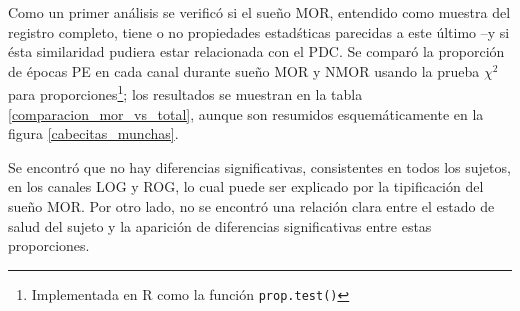 \documentclass[12pt,a4paper]{mitthesis}
\begin{document}
Como un primer an\'alisis se verific\'o si el sue\~no MOR, entendido como muestra del registro
completo, tiene o no propiedades estad\'sticas parecidas a este \'ultimo --y si \'esta similaridad 
pudiera estar relacionada con el PDC. 
Se compar\'o la proporci\'on de \'epocas PE en cada canal durante sue\~no MOR y NMOR usando la 
prueba $\chi^{2}$ para proporciones\footnote{Implementada en R como la funci\'on 
\texttt{prop.test()}}; los resultados se muestran en la tabla \ref{comparacion_mor_vs_total},
aunque son resumidos esquem\'aticamente en la figura \ref{cabecitas_munchas}.

Se encontr\'o que no hay diferencias significativas, consistentes en todos los sujetos, en los 
canales LOG y ROG, lo cual puede ser explicado por la tipificaci\'on del sue\~no MOR. 
Por otro lado, no se encontr\'o una relaci\'on clara entre el estado de salud del sujeto y la 
aparici\'on de diferencias significativas entre estas proporciones.
\end{document}
